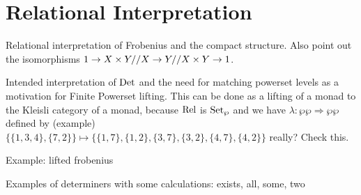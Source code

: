 \section{Relational Interpretation}


Relational interpretation of Frobenius and the compact structure. Also
point out the isomorphisms $1 \to X\times Y // X \to Y // X \times Y \to 1$.

Intended interpretation of $\mathrm{Det}$ and the need for matching powerset
levels as a motivation for Finite Powerset lifting. 
This can be done as a lifting of a monad to the Kleisli category of a
monad, because $\mathrm{Rel}$ is $\mathrm{Set}_\wp$ and we have $\lambda : \wp\wp
\Rightarrow \wp\wp$ defined by (example) $\{\{1,3,4\},\{7,2\}\} \mapsto
\{\{1,7\},\{1,2\},\{3,7\},\{3,2\},\{4,7\},\{4,2\}\}$ really? Check
this. 

Example: lifted frobenius

Examples of determiners with some calculations: exists, all, some, two





